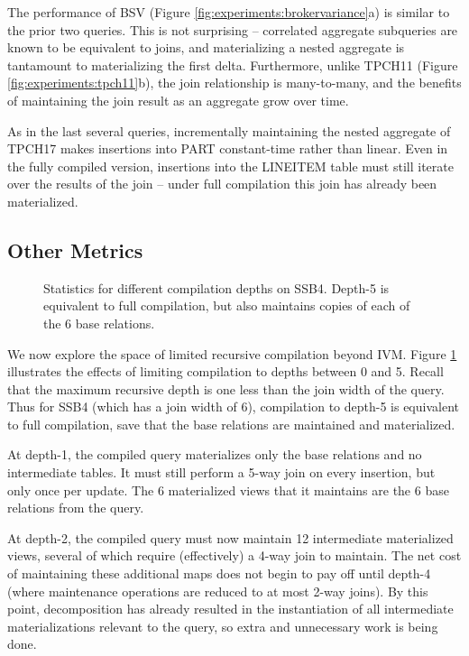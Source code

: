 The performance of BSV (Figure \ref{fig:experiments:brokervariance}a) is similar to the prior two queries.  This is not surprising -- correlated aggregate subqueries are known to be equivalent to joins, and materializing a nested aggregate is tantamount to materializing the first delta.  Furthermore, unlike TPCH11 (Figure \ref{fig:experiments:tpch11}b), the join relationship is many-to-many, and the benefits of maintaining the join result as an aggregate grow over time.

As in the last several queries, incrementally maintaining the nested aggregate of TPCH17 makes insertions into PART constant-time rather than linear.  Even in the fully compiled version, insertions into the LINEITEM table must still iterate over the results of the join -- under full compilation this join has already been materialized.

\subsection{Other Metrics}
\label{sec:experiments:othermetrics}

\begin{figure}
\begin{center}
\resizebox{3.4in}{!}{

}
\caption{Statistics for different compilation depths on SSB4.  Depth-5 is equivalent to full compilation, but also maintains copies of each of the 6 base relations.}
\label{fig:experiments:ssb4depth}
\end{center}
\vspace*{-0.2in}
\end{figure}
We now explore the space of limited recursive compilation beyond IVM.  Figure \ref{fig:experiments:ssb4depth} illustrates the effects of limiting compilation to depths between 0 and 5.  Recall that the maximum recursive depth is one less than the join width of the query.  Thus for SSB4 (which has a join width of 6), compilation to depth-5 is equivalent to full compilation, save that the base relations are maintained and materialized.

At depth-1, the compiled query materializes only the base relations and no intermediate tables.  It must still perform a 5-way join on every insertion, but  only once per update.  The 6 materialized views that it maintains are the 6 base relations from the query.  

At depth-2, the compiled query must now maintain 12 intermediate materialized views, several of which require (effectively) a 4-way join to maintain.  The net cost of maintaining these additional maps does not begin to pay off until depth-4 (where maintenance operations are reduced to at most 2-way joins).  By this point, decomposition has already resulted in the instantiation of all intermediate materializations relevant to the query, so extra and unnecessary work is being done.  

